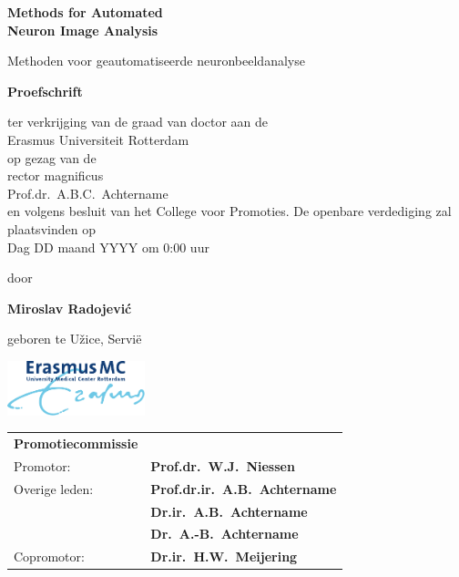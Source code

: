 %
%

\setlength{\parindent}{0pt}
\thispagestyle{empty}

\begin{center}
  
  \vspace*{5mm}
  {\huge\bf Methods for Automated\\[0.3ex] Neuron Image Analysis\\}

  \vfill
  \vfill
  \vfill

  {\large Methoden voor geautomatiseerde neuronbeeldanalyse\\[1ex]}


  \vfill
  \vfill
  \vfill
  \vfill

  {\large\bf Proefschrift}
  {\large 
  \vfill
  \vfill
  
  \normalsize
  
  ter verkrijging van de graad van doctor aan de \\Erasmus Universiteit Rotterdam\\
op gezag van de \\rector magnificus\\
  \vfill
Prof.dr.~A.B.C.~Achtername\\
  \vfill
en volgens besluit van het College voor Promoties. 
  \vfill
De openbare verdediging zal plaatsvinden op \\Dag DD maand YYYY om 0:00 uur
  
  
  \vfill
  \vfill
  
  \large
  door}

  \vfill
  \vfill
  \vfill

  {\large\bf Miroslav Radojevi\'{c}}

  \vfill

  {\large geboren te U\v{z}ice, Servi{\"e}}

  \vfill
  \vfill
\includegraphics[width=0.3\textwidth]{./logos/emc1}
\end{center}


\newpage
\thispagestyle{empty}
\label{othersideformal}

\begin{tabular}{@{}ll@{}}
\large\bf{Promotiecommissie} &\\ [8ex]
Promotor:    & {\bf Prof.dr.~W.J.~Niessen}\\[3ex]
Overige leden: & {\bf Prof.dr.ir.~A.B.~Achtername}\\[1ex]
&{\bf Dr.ir.~A.B.~Achtername}\\[1ex]
&{\bf Dr.~A.-B.~Achtername}\\[3ex]
Copromotor: & {\bf Dr.ir.~H.W.~Meijering}\\
\end{tabular}